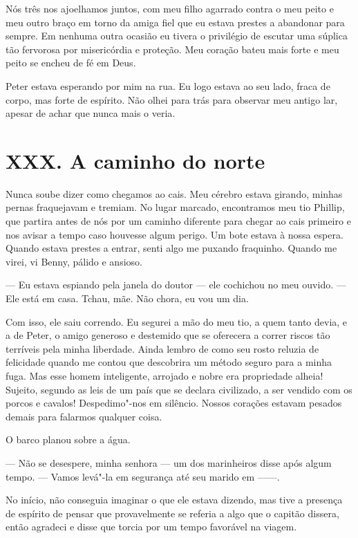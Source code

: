 Nós três nos ajoelhamos juntos, com meu filho agarrado contra o meu
peito e meu outro braço em torno da amiga fiel que eu estava prestes a
abandonar para sempre. Em nenhuma outra ocasião eu tivera o privilégio
de escutar uma súplica tão fervorosa por misericórdia e proteção. Meu
coração bateu mais forte e meu peito se encheu de fé em Deus.

Peter estava esperando por mim na rua.
Eu logo estava ao seu lado, fraca de corpo, mas forte de espírito. Não
olhei para trás para observar meu antigo lar, apesar de achar que nunca
mais o veria.

\chapter{XXX. A caminho do norte}

Nunca soube dizer como chegamos ao
cais. Meu cérebro estava girando, minhas pernas fraquejavam e tremiam.
No lugar marcado, encontramos meu tio Phillip, que partira antes de nós
por um caminho diferente para chegar ao cais primeiro e nos avisar a
tempo caso houvesse algum perigo. Um bote estava à nossa espera. Quando
estava prestes a entrar, senti algo me puxando fraquinho. Quando me
virei, vi Benny, pálido e ansioso.

--- Eu estava espiando pela janela do doutor --- ele cochichou no meu
ouvido. --- Ele está em casa. Tchau, mãe. Não chora, eu vou um dia.

Com isso, ele saiu correndo. Eu segurei a mão do meu tio, a quem tanto
devia, e a de Peter, o amigo generoso e destemido que se oferecera a
correr riscos tão terríveis pela minha liberdade. Ainda lembro de como
seu rosto reluzia de felicidade quando me contou que descobrira um
método seguro para a minha fuga. Mas esse homem inteligente, arrojado e
nobre era propriedade alheia! Sujeito, segundo as leis de um país que se
declara civilizado, a ser vendido com os porcos e cavalos! Despedimo"-nos
em silêncio. Nossos corações estavam pesados demais para falarmos
qualquer coisa.

O barco planou sobre a água.

--- Não se desespere, minha senhora --- um dos marinheiros disse após
algum tempo. --- Vamos levá"-la em segurança até seu marido em ------.

No início, não conseguia imaginar o que ele estava dizendo, mas tive a
presença de espírito de pensar que provavelmente se referia a algo que o
capitão dissera, então agradeci e disse que torcia por um tempo
favorável na viagem.

